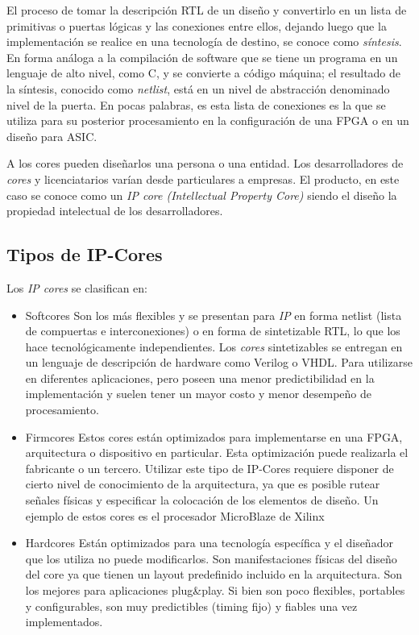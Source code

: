 El proceso de tomar la descripción RTL de un diseño y convertirlo en
un lista de primitivas o puertas lógicas y las conexiones entre ellos,
dejando luego que la implementación se realice en una tecnología de
destino, se conoce como \textit{síntesis}. En forma análoga a la
compilación de software que se tiene un programa en un lenguaje de
alto nivel, como C, y se convierte a código máquina; el resultado de
la síntesis, conocido como \textit{netlist}, está en un nivel de
abstracción denominado nivel de la puerta. En pocas palabras, es esta
lista de conexiones es la que se utiliza para su posterior procesamiento
en la configuración de una FPGA o en un diseño para ASIC.
	
A los cores pueden diseñarlos una persona o una entidad. Los
desarrolladores de \textit{cores} y licenciatarios varían desde
particulares a empresas. El producto, en este caso se conoce como un
\textit{IP core (Intellectual Property Core)} siendo el diseño la
propiedad intelectual de los desarrolladores.
	
\subsection{Tipos de IP-Cores}

Los \textit{IP cores} se clasifican en:

\begin{itemize}
\item{Softcores} Son los más flexibles y se presentan para \textit{IP}
  en forma netlist (lista de compuertas e interconexiones) o en forma
  de sintetizable RTL, lo que los hace tecnológicamente
  independientes. Los \textit{cores} sintetizables se entregan en un
  lenguaje de descripción de hardware como Verilog o VHDL. Para utilizarse en diferentes aplicaciones, pero poseen una menor
  predictibilidad en la implementación y suelen tener un mayor costo y
  menor desempeño de procesamiento.

\item{Firmcores} Estos cores están optimizados para
  implementarse en una FPGA, arquitectura o dispositivo en
  particular. Esta optimización puede realizarla el fabricante
  o un tercero. Utilizar este tipo de IP-Cores requiere disponer
  de cierto nivel de conocimiento de la arquitectura, ya que es
  posible rutear señales físicas y especificar la colocación de los
  elementos de diseño. Un ejemplo de estos cores es el procesador
  MicroBlaze de Xilinx~\cite{Etiqueta04}

\item{Hardcores} Están optimizados para una tecnología específica y el diseñador que los utiliza no puede modificarlos. Son
  manifestaciones físicas del diseño del core ya que tienen un layout
  predefinido incluido en la arquitectura. Son los mejores para
  aplicaciones plug\&play. Si bien son poco flexibles, portables y
  configurables, son muy predictibles (timing fijo) y fiables
  una vez implementados.
\end{itemize}

